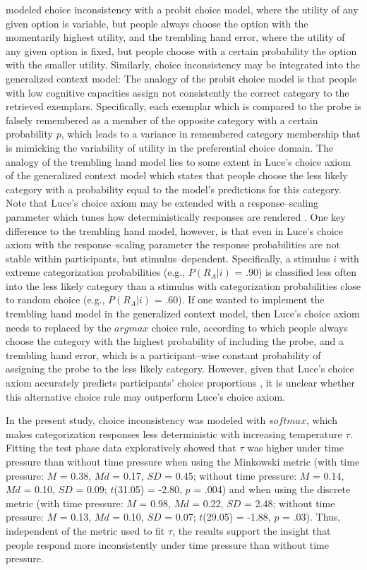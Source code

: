 \documentclass[a4paper,man,natbib]{apa6}
\begin{document}
\cite{olschewski2018taxing} modeled choice inconsistency with a probit choice model, where the utility of any given option is variable, but people always choose the option with the momentarily highest utility, and the trembling hand error, where the utility of any given option is fixed, but people choose with a certain probability the option with the smaller utility. 
Similarly, choice inconsistency may be integrated into the generalized context model: The analogy of the probit choice model is that people with low cognitive capacities assign not consistently the correct category to the retrieved exemplars. Specifically, each exemplar which is compared to the probe is falsely remembered as a member of the opposite category with a certain probability $p$, which leads to a variance in remembered category membership that is mimicking the variability of utility in the preferential choice domain. The analogy of the trembling hand model lies to some extent in Luce's choice axiom of the generalized context model which states that people choose the less likely category with a probability equal to the model's predictions for this category. Note that Luce's choice axiom may be extended with a response--scaling parameter which tunes how deterministically responses are rendered \citep{nosofsky2002exemplar, nosofsky2011generalized, ashby1993relations}. One key difference to the trembling hand model, however, is that even in Luce's choice axiom with the response--scaling parameter the response probabilities are not stable within participants, but stimulus--dependent. Specifically, a stimulus $i$ with extreme categorization probabilities (e.g., $P(R_{A}|i)$ = .90) is classified less often into the less likely category than a stimulus with categorization probabilities close to random choice (e.g., $P(R_{A}|i)$ = .60). If one wanted to implement the trembling hand model in the generalized context model, then Luce's choice axiom needs to replaced by the $argmax$ choice rule, according to which people always choose the category with the highest probability of including the probe, and a trembling hand error, which is a participant--wise constant probability of assigning the probe to the less likely category. However, given that Luce's choice axiom accurately predicts participants' choice proportions \citep{nosofsky1987attention, mckinley1995investigations, lamberts2000information}, it is unclear whether this alternative choice rule may outperform Luce's choice axiom. 

In the present study, choice inconsistency was modeled with $softmax$, which makes categorization responses less deterministic with increasing temperature $\tau$. Fitting the test phase data exploratively showed that $\tau$ was higher under time pressure than without time pressure when using the Minkowski metric (with time pressure: $M$ = 0.38, $Md$ = 0.17, $SD$ = 0.45; without time pressure: $M$ = 0.14, $Md$ = 0.10, $SD$ = 0.09; $t$(31.05) = -2.80, $p$ = .004) and when using the discrete metric (with time pressure: $M$ = 0.98, $Md$ = 0.22, $SD$ = 2.48; without time pressure: $M$ = 0.13, $Md$ = 0.10, $SD$ = 0.07; $t$(29.05) = -1.88, $p$ = .03). Thus, independent of the metric used to fit $\tau$, the results support the insight that people respond more inconsistently under time pressure than without time pressure.
\end{document}
